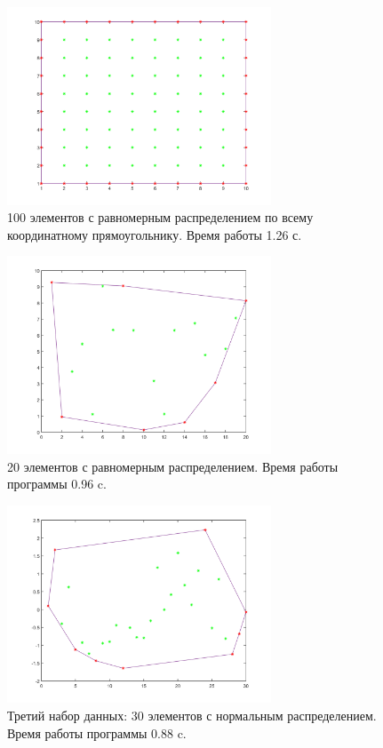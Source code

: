 \documentclass[12pt]{article}
\begin{document}
\begin {figure}[ht]
	\centering
   \includegraphics[width=0.7\textwidth]{1.png}
   \caption{100 элементов с равномерным распределением по всему координатному прямоугольнику. Время работы 1.26 с.}
		\label{fig:1}
\end{figure}
\begin {figure}[ht]
\centering
   \includegraphics[width=0.7\textwidth]{2.png}
   \caption{20 элементов с равномерным распределением. Время работы программы 0.96 c.}
\end{figure}
\begin {figure}[ht]
\centering
   \includegraphics[width=0.7\textwidth]{3.png}
   \caption{Третий набор данных: 30 элементов с нормальным распределением. Время работы программы 0.88 c.}
\end{figure}
\end{document}
